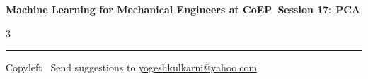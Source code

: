 \documentclass[8pt,landscape]{article}
\begin{document}
\footnotesize

\begin{center}
\Large{\textbf{Machine Learning for Mechanical Engineers at CoEP\ Session 17: PCA}}
\end{center}

\begin{multicols}{3}

\end{multicols}

\rule{\linewidth}{0.25pt}
\scriptsize
Copyleft \textcopyleft\  Send suggestions to
\href{http://www.yogeshkulkarni.com}{yogeshkulkarni@yahoo.com}
\end{document}
